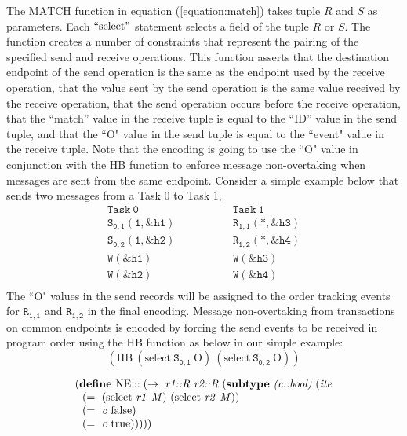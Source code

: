 The $\mathrm{MATCH}$ function in equation (\ref{equation:match}) takes tuple $R$ and $S$ as parameters. Each $``\mathrm{select}"$ statement selects a field of the tuple $R$ or $S$. The function creates a number of constraints that represent the pairing
of the specified send and receive operations. This function asserts that the
destination endpoint of the send operation is the same as the endpoint used by
the receive operation, that the value sent by the send operation is the same
value received by the receive operation, that the send operation occurs before
the receive operation, that the ``match'' value in the receive tuple is
equal to the ``ID'' value in the send tuple, and that the ``O" value in the send tuple is equal to the ``event" value in the receive tuple. Note that the encoding is going to use the ``O"  value in conjunction with the HB function to enforce message non-overtaking when messages are sent from the same endpoint. Consider a simple example below that sends two messages from a Task 0 to Task 1,
\[
\begin{array}{l|l}
\;\;\;\;\;\;\;\;\mathtt{Task\ 0}\;\;\;\;\;\;\;\; & \;\;\;\;\;\;\;\; \mathtt{Task\ 1}\;\;\;\;\;\;\;\; \\
\hline
\;\;\;\;\;\;\;\;\mathtt{S_{0,1}(1,\&h1)}\;\;\;\;\;\;\;\; & \;\;\;\;\;\;\;\; \mathtt{R_{1,1}(*,\&h3)}\;\;\;\;\;\;\;\; \\
\;\;\;\;\;\;\;\;\mathtt{S_{0,2}(1,\&h2)}\;\;\;\;\;\;\;\; & \;\;\;\;\;\;\;\; \mathtt{R_{1,2}(*,\&h4)}\;\;\;\;\;\;\;\; \\
\;\;\;\;\;\;\;\;\mathtt{W(\&h1)}\;\;\;\;\;\;\;\; & \;\;\;\;\;\;\;\; \mathtt{W(\&h3)}\;\;\;\;\;\;\;\; \\
\;\;\;\;\;\;\;\;\mathtt{W(\&h2)}\;\;\;\;\;\;\;\; & \;\;\;\;\;\;\;\; \mathtt{W(\&h4)}\;\;\;\;\;\;\;\; \\
\end{array}
\]
The ``O" values in the send records will be assigned to the order tracking events for $\mathtt{R_{1,1}}$ and $\mathtt{R_{1,2}}$ in the final encoding. Message non-overtaking from transactions on common endpoints is encoded by forcing the send events to be received in program order using the HB function as below in our simple example:
\[(\mathrm{HB}\ (\mathrm{select}\ \mathtt{S_{0,1}}\ \mathrm{O})\ (\mathrm{select}\ \mathtt{S_{0,2}}\ \mathrm{O}))\]


\begin{equation}
\begin{array}{l}
(\cfgt{define}\ \mathrm{NE}::(\rightarrow\ \cfgnt{r1::R}\ \cfgnt{r2::R}\ (\cfgt{subtype}\ \cfgnt{(c::bool)}\ (\cfgnt{ite} \\
\ \ (=\ (\mathrm{select}\ \mathit{r1}\ \mathit{M})\ (\mathrm{select}\ \mathit{r2}\ \mathit{M})) \\
\ \ (=\ \mathit{c}\ \mathrm{false}) \\
\ \ (=\ \mathit{c}\ \mathrm{true})))))
\end{array}
\label{equation:ne}
\end{equation}

